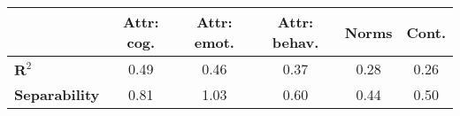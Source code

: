 \begin{tabular}{|l|c|c|c|c|c|}
\hline
&\textbf{Attr: cog.}&\textbf{Attr: emot.}&\textbf{Attr: behav.}&\textbf{Norms}&\textbf{Cont.}\\\hline\hline
$\textbf{R}^2$&0.49&0.46&0.37&0.28&0.26\\\hline
\textbf{Separability}&0.81&1.03&0.60&0.44&0.50\\\hline
\end{tabular}
